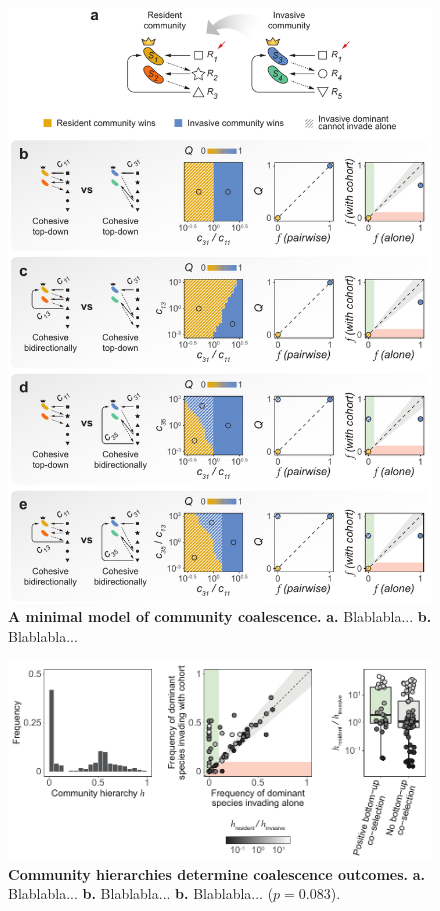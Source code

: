 \documentclass[a4paper,10pt]{article}
\begin{document}
\begin{figure}[!h]
\centering
\internallinenumbers
\includegraphics[scale=0.7,keepaspectratio]{figs/fig4_v2.pdf}
\caption{\textbf{A minimal model of community coalescence.}
\textbf{a.} Blablabla...
\textbf{b.} Blablabla...}
\label{fig4}
\end{figure}

\clearpage

\begin{figure}[!h]
\centering
\internallinenumbers
\includegraphics[scale=0.7,keepaspectratio]{figs/fig5.pdf}
\caption{\textbf{Community hierarchies determine coalescence outcomes.}
\textbf{a.} Blablabla...
\textbf{b.} Blablabla...
\textbf{b.} Blablabla... ($p=0.083$).}
\label{fig5}
\end{figure}
\end{document}
